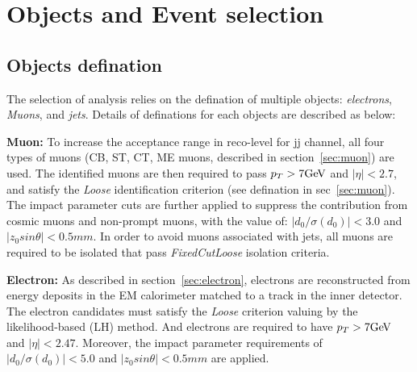 \section{Objects and Event selection}

\subsection{Objects defination}

The selection of analysis relies on the defination of multiple objects: \textit{electrons}, \textit{Muons}, and \textit{jets}.
Details of definations for each objects are described as below:

\textbf{Muon:} 
To increase the acceptance range in reco-level for \llll jj channel, all four types of muons 
(CB, ST, CT, ME muons, described in section~\ref{sec:muon}) are used.
The identified muons are then required to pass $p_{T} > 7 \text{Ge\kern -0.1em V}$ and $|\eta| < 2.7$,
and satisfy the \textit{Loose} identification criterion (see defination in sec~\ref{sec:muon}).
The impact parameter cuts are further applied to suppress the contribution from cosmic muons and non-prompt muons,
with the value of: $|d_{0}/\sigma(d_{0})| < 3.0$ and $|z_{0} sin\theta| < 0.5 mm$.
In order to avoid muons associated with jets, all muons are required to be isolated that pass \textit{FixedCutLoose} isolation criteria.

\textbf{Electron:} 
As described in section~\ref{sec:electron}, electrons are reconstructed from energy deposits in the EM calorimeter matched to a track in the inner detector.
The electron candidates must satisfy the \textit{Loose} criterion valuing by the likelihood-based (LH) method.
And electrons are required to have $p_{T} > 7 \text{Ge\kern -0.1em V}$ and $|\eta| < 2.47$.
Moreover, the impact parameter requirements of $|d_{0}/\sigma(d_{0})| < 5.0$ and $|z_{0} sin\theta| < 0.5 mm$ are applied.
